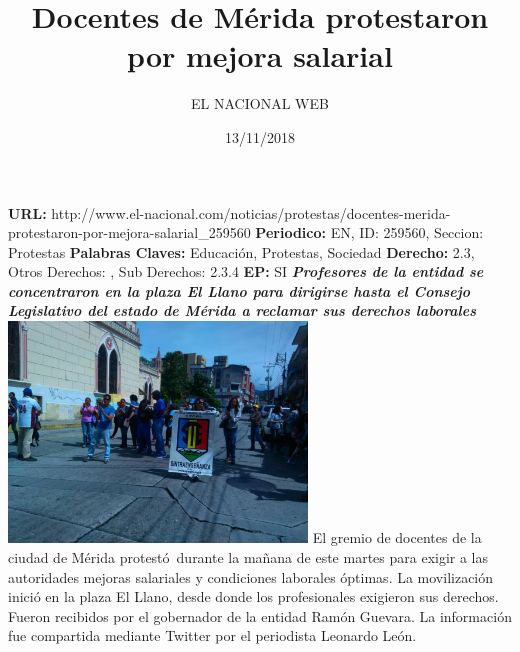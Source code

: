 \documentclass{article}%
\title{\textbf{Docentes de Mérida protestaron por mejora salarial}}%
\author{EL NACIONAL WEB}%
\date{13/11/2018}%
\begin{document}
%
\normalsize%
\maketitle%
\textbf{URL: }%
http://www.el{-}nacional.com/noticias/protestas/docentes{-}merida{-}protestaron{-}por{-}mejora{-}salarial\_259560\newline%
%
\textbf{Periodico: }%
EN, %
ID: %
259560, %
Seccion: %
Protestas\newline%
%
\textbf{Palabras Claves: }%
Educación, Protestas, Sociedad\newline%
%
\textbf{Derecho: }%
2.3, %
Otros Derechos: %
, %
Sub Derechos: %
2.3.4\newline%
%
\textbf{EP: }%
SI\newline%
\newline%
%
\textbf{\textit{Profesores de la entidad se concentraron en la plaza El Llano para dirigirse hasta el Consejo Legislativo del estado de Mérida a reclamar sus derechos laborales}}%
\newline%
\newline%
%
\includegraphics[width=300px]{95.jpg}%
\newline%
%
El gremio de docentes de la ciudad de Mérida protestó~durante la mañana de este martes para exigir a las autoridades mejoras salariales y condiciones laborales óptimas.%
\newline%
%
La movilización inició en la plaza El Llano, desde donde los profesionales exigieron sus derechos. Fueron recibidos por el gobernador de la entidad Ramón Guevara.%
\newline%
%
La información fue compartida mediante Twitter por el periodista Leonardo León.%
\newline%
%
\end{document}
